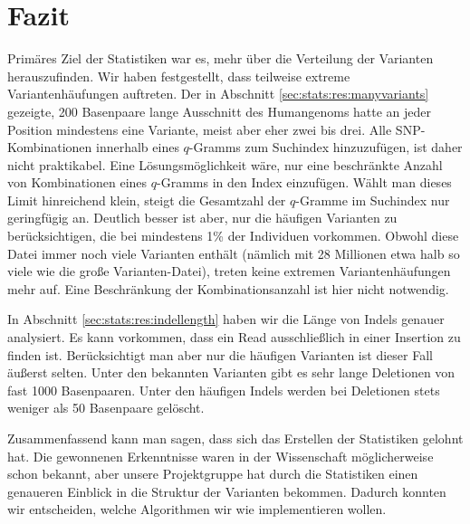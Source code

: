 \section{Fazit}

Primäres Ziel der Statistiken war es, mehr über die Verteilung der Varianten herauszufinden. Wir haben festgestellt, dass teilweise extreme Variantenhäufungen auftreten. Der in Abschnitt \ref{sec:stats:res:manyvariants} gezeigte, 200 Basenpaare lange Ausschnitt des Humangenoms hatte an jeder Position mindestens eine Variante, meist aber eher zwei bis drei. Alle SNP-Kombinationen innerhalb eines $q$-Gramms zum Suchindex hinzuzufügen, ist daher nicht praktikabel. Eine Lösungsmöglichkeit wäre, nur eine beschränkte Anzahl von Kombinationen eines $q$-Gramms in den Index einzufügen. Wählt man dieses Limit hinreichend klein, steigt die Gesamtzahl der $q$-Gramme im Suchindex nur geringfügig an. Deutlich besser ist aber, nur die häufigen Varianten zu berücksichtigen, die bei mindestens 1\% der Individuen vorkommen. Obwohl diese Datei immer noch viele Varianten enthält (nämlich mit 28 Millionen etwa halb so viele wie die große Varianten-Datei), treten keine extremen Variantenhäufungen mehr auf. Eine Beschränkung der Kombinationsanzahl ist hier nicht notwendig.

In Abschnitt \ref{sec:stats:res:indellength} haben wir die Länge von Indels genauer analysiert. Es kann vorkommen, dass ein Read ausschließlich in einer Insertion zu finden ist. Berücksichtigt man aber nur die häufigen Varianten ist dieser Fall äußerst selten. Unter den bekannten Varianten gibt es sehr lange Deletionen von fast 1000 Basenpaaren. Unter den häufigen Indels werden bei Deletionen stets weniger als 50 Basenpaare gelöscht.

Zusammenfassend kann man sagen, dass sich das Erstellen der Statistiken gelohnt hat. Die gewonnenen Erkenntnisse waren in der Wissenschaft möglicherweise schon bekannt, aber unsere Projektgruppe hat durch die Statistiken einen genaueren Einblick in die Struktur der Varianten bekommen. Dadurch konnten wir entscheiden, welche Algorithmen wir wie implementieren wollen.